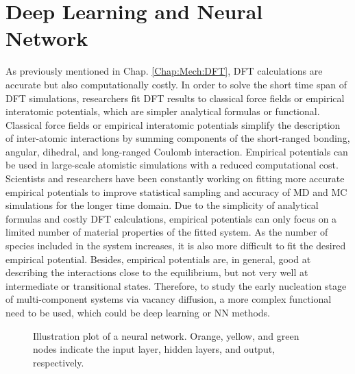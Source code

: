 \section{Deep Learning and Neural Network}
\label{Chap:Mech:NN}

As previously mentioned in Chap. \ref{Chap:Mech:DFT}, \ac{DFT} calculations are accurate but also computationally costly. In order to solve the short time span of \ac{DFT} simulations, researchers fit \ac{DFT} results to classical force fields or empirical interatomic potentials, which are simpler analytical formulas or functional. Classical force fields or empirical interatomic potentials simplify the description of inter-atomic interactions by summing components of the short-ranged bonding\cite{jones1924determination}, angular\cite{justo1998interatomic}, dihedral\cite{cornell1995second}, and long-ranged Coulomb interaction\cite{liang2013classical}. Empirical potentials can be used in large-scale atomistic simulations with a reduced computational cost. Scientists and researchers have been constantly working on fitting more accurate empirical potentials to improve statistical sampling and accuracy of \ac{MD} and \ac{MC} simulations for the longer time domain. Due to the simplicity of analytical formulas and costly \ac{DFT} calculations, empirical potentials can only focus on a limited number of material properties of the fitted system. As the number of species included in the system increases, it is also more difficult to fit the desired empirical potential. Besides, empirical potentials are, in general, good at describing the interactions close to the equilibrium, but not very well at intermediate or transitional states. Therefore, to study the early nucleation stage of multi-component systems via vacancy diffusion, a more complex functional need to be used, which could be deep learning or \ac{NN} methods.

\begingroup
\begin{figure}[!ht]
  \centering
  \caption[Illustration plot of a neural network.]{Illustration plot of a neural network. Orange, yellow, and green nodes indicate the input layer, hidden layers, and output, respectively.}
  \label{Chap:Meth:NN:fig1}
\end{figure}
\endgroup

